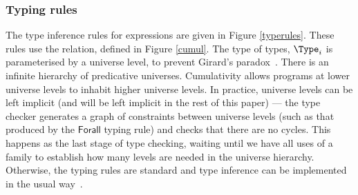 \subsubsection{Typing rules}

\label{sect:typerules}

The type inference rules for \TT{} expressions are given in Figure
\ref{typerules}.  These rules use the  relation, defined in
Figure \ref{cumul}. The type of types, $\Type_i$ is parameterised by a universe
level, to prevent Girard's paradox~\cite{coquand1986analysis}.  There is an
infinite hierarchy of predicative universes.  Cumulativity allows programs at
lower universe levels to inhabit higher universe levels. In practice, universe levels
can be left implicit (and will be left implicit in the rest of this paper) ---
the type checker generates a graph of constraints between universe levels (such
as that produced by the $\mathsf{Forall}$ typing rule) and checks that there
are no cycles. This happens as the last stage of type checking, waiting until
we have all uses of a family to establish how many levels are needed in the
universe hierarchy.
Otherwise, the typing rules are standard and type inference can
be implemented in the usual way~\cite{loh2010tutorial}.

